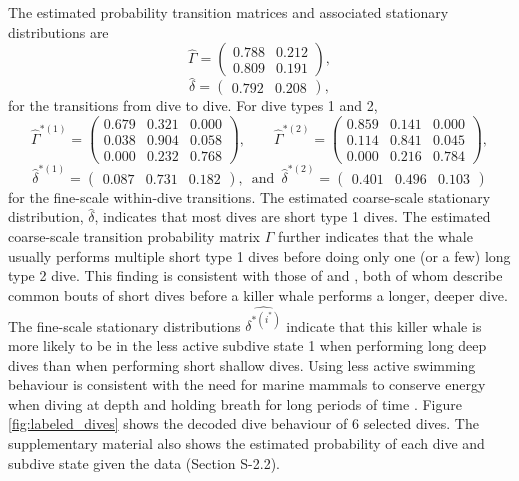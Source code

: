 The estimated probability transition matrices and associated stationary distributions are
%
$$\hat \Gamma = \begin{pmatrix} 
0.788 & 0.212 \\
0.809 & 0.191
\end{pmatrix},$$
$$\hat \delta = \begin{pmatrix} 0.792 & 0.208 \end{pmatrix},$$
%
for the transitions from dive to dive. For dive types 1 and 2,
$$\hat \Gamma^{*(1)} = \begin{pmatrix} 
0.679 & 0.321 & 0.000 \\
0.038 & 0.904 & 0.058 \\
0.000 & 0.232 & 0.768
\end{pmatrix}, \qquad 
\hat \Gamma^{*(2)} = \begin{pmatrix} 
0.859 & 0.141 & 0.000 \\
0.114 & 0.841 & 0.045 \\
0.000 & 0.216 & 0.784
\end{pmatrix},$$
$$\hat \delta^{*(1)} = \begin{pmatrix} 0.087 & 0.731 & 0.182 \end{pmatrix}, \enspace \text{and} \enspace \hat \delta^{*(2)} = \begin{pmatrix} 0.401 & 0.496 & 0.103 \end{pmatrix}$$
%
for the fine-scale within-dive transitions.
The estimated coarse-scale stationary distribution, $\hat{\delta}$, indicates that most dives are short type 1 dives. The estimated coarse-scale transition probability matrix $\hat \Gamma$ further indicates that the whale usually performs multiple short type 1 dives before doing only one (or a few) long type 2 dive. This finding is consistent with those of \citet{Tennessen:2019b} and \citet{Williams:2009}, both of whom describe common bouts of short dives before a killer whale performs a longer, deeper dive. The fine-scale stationary distributions $\hat{\delta^{*(i^*)}}$ indicate that this killer whale is more likely to be in the less active subdive state 1 when performing long deep dives than when performing short shallow dives. Using less active swimming behaviour is consistent with the need for marine mammals to conserve energy when diving at depth and holding breath for long periods of time \citep{Williams:1999,Hastie:2006}. Figure \ref{fig:labeled_dives} shows the decoded dive behaviour of 6 selected dives. The supplementary material also shows the estimated probability of each dive and subdive state given the data (Section S-2.2).


